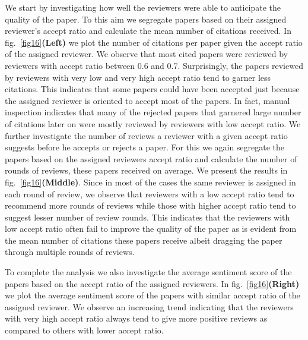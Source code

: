 We start by investigating how well the reviewers were able to anticipate the quality of the paper. To this aim we segregate papers based on their assigned reviewer's accept ratio and calculate the mean number of citations received. In fig.~\ref{fig16}{\bf (Left)} we plot the number of citations per paper given the accept ratio of the assigned reviewer. We observe that most cited papers were reviewed by reviewers with accept ratio between 0.6 and 0.7. Surprisingly, the papers reviewed by reviewers with very low and very high accept ratio tend to garner less citations. This indicates that some papers could have been accepted just because the assigned reviewer is oriented to accept most of the papers. In fact, manual inspection indicates that many of the rejected papers that garnered large number of citations later on were mostly reviewed by reviewers with low accept ratio. We further investigate the number of reviews a reviewer with a given accept ratio suggests before he accepts or rejects a paper. For this we again segregate the papers based on the assigned reviewers accept ratio and calculate the number of rounds of reviews, these papers received on average. We present the results in fig.~\ref{fig16}{\bf (Middle)}. Since in most of the cases the same reviewer is assigned in each round of review, we observe that reviewers with a low accept ratio tend to recommend more rounds of reviews while those with higher accept ratio tend to suggest lesser number of review rounds. This indicates that the reviewers with low accept ratio often fail to improve the quality of the paper as is evident from the mean number of citations these papers receive albeit dragging the paper through multiple rounds of reviews.


To complete the analysis we also investigate the average sentiment score of the papers based on the accept ratio of the assigned reviewers. In fig.~\ref{fig16}{\bf (Right)} we plot the average sentiment score of the papers with similar accept ratio of the assigned reviewer. We observe an increasing trend indicating that the reviewers with very high accept ratio always tend to give more positive reviews as compared to others with lower accept ratio. 



